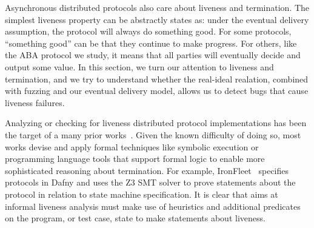 Asynchronous distributed protocols also care about liveness and termination.
The simplest liveness property can be abstractly states as: under the eventual delivery assumption, the protocol will always do something good. 
For some protocols, ``something good'' can be that they continue to make progress.
For others, like the ABA protocol we study, it means that all parties will eventually decide and output some value.
In this section, we turn our attention to liveness and termination, and we try to understand whether the real-ideal realation, combined with fuzzing and our eventual delivery model, allows us to detect bugs that cause liveness failures.

Analyzing or checking for liveness distributed protocol implementations has been the target of a many prior works~\cite{ironfleet, macemc, bymc, formalbyzantine}.
Given the known difficulty of doing so, most works devise and apply formal techniques like symbolic execution or programming language tools that support formal logic to enable more sophisticated reasoning about termination. 
For example, IronFleet~\cite{ironfleet} specifies protocols in Dafny and uses the Z3 SMT solver to prove statements about the protocol in relation to state machine specification.
It is clear that aims at informal liveness analysis must make use of heuristics and additional predicates on the program, or test case, state to make statements about liveness.

